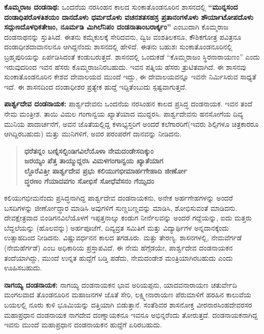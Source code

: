 \textbf{ಕೊಮ್ಮರಾಜ ದಂಡನಾಥ:} ಒಂದನೆಯ ನರಸಿಂಹನ ಕಾಲದ ಸುಂಕಾತೊಂಡನೂರಿನ ಶಾಸನದಲ್ಲಿ \textbf{“ಮುನ್ನಸಂದ\general{\break } ದಂಡಾಧಿಪರೊಳತಿಶಯಂ ದಾನದೊಳು ಧರ್ಮದೊಳು ವಚನಶತಸಹಸ್ರ ಪ್ರತಾನಂಗಳೊಳು ಶೌರ್ಯಾಟೋಪದೊಳು\general{\break } ಸದ್ಗುಣದೊಳಧಿಕತೇಜಂ, ನೂರ್ಮಡಿ ಮಿಗಿಲೆನಿಪಂ ದಂಡನಾತಾಂಬರಾರ್ಕ್ಕಂ” }ಎಂಬುದಾಗಿ ಕೊಮ್ಮರಾಜ ದಂಡನಾಥನನ್ನು ಸ್ತುತಿಸಿದೆ. ಈತನು ಕಮ್ಮೆಕುಲಕ್ಕೆ ಸೇರಿದವನು, ದ್ವಿಜ ವಂಶತಿಲಕನೂ, ಕೌಶಿಕಗೋತ್ರ ಪವಿತ್ರನೂ ದಂಡಾಧೀಶದಾವಾನಲನೂ ಆಗಿದ್ದನೆಂದು ಶಾಸನದಲ್ಲಿ ಹೇಳಿದೆ. ಈತನು ಬಹುಶಃ ಸುಂಕಾತೊಂಡನೂರಿನಲ್ಲಿ ಬ್ರಹ್ಮಪುರಿಯನ್ನು ಏರ್ಪಡಿಸಿದಂತೆ ಕಂಡುಬರುತ್ತದೆ. ಶಾಸನದಲ್ಲಿ ಒಂದುಕಡೆ “ಕೊಮ್ಮರಾಜಂ ಸ್ಥಿರನಾರಾಯಣಂ” ಎಂದು ಇರುವುದರಿಂದ ಇವನ ಹೆಸರು ಕೊಮ್ಮರಾಜನಿರಬಹುದು. ಇವನ ಪತ್ನಿಯ ಹೆಸರು ತ್ರುಟಿತವಾಗಿದೆ. ಈ ಶಾಸನವು ಸುಂಕಾತೊಂಡನೂರಿನ ಕೇಶವ ದೇವಾಲಯದ ಮುಂದೆ ಇದ್ದು, ಈ ದೇವಾಲಯವನ್ನೂ ಇವನೇ ನಿರ್ಮಿಸಿರುವ ಸಾಧ್ಯತೆ ಇದೆ. ಈ ಶಾಸನದಿಂದ ದಂಡಾಧೀಶರ ಪ್ರತ್ಯೇಕ ಹುದ್ದೆ ಇದ್ದಿತೆಂಬುದು ಸ್ಪಷ್ಟವಾಗುತ್ತದೆ.

\textbf{ಪಾರ್ಶ್ವದೇವ ದಂಡನಾಯಕ:} ಪಾರ್ಶ್ವದೇವನು ಒಂದನೆಯ ನರಸಿಂಹನ ಕಾಲದ ಪ್ರಸಿದ್ಧ ದಂಡನಾಯಕ. ಇವನ ತಂದೆ ನೇಮ ಮಂತ್ರೀಶ. ತಾಯಿ ವಿಮಲ ಗಂಗಾನ್ವಯ ಖ್ಯಾತೆಯಾದ ಮುದ್ದರಸಿ. ಪಾರ್ಶ್ವದೇವನು ಹನಸೋಗೆಯ ದಿವ್ಯ ಮುನಿಯ ಪಾದಾರ್ಚನೆಗೆ, ಅವನ ಜೊತೆಯಲ್ಲಿದ್ದ ಕಳಾಭ್ಯಸ್ತರಿಗೆ ಅಂದರೆ ಕಲೆಗಾರರಿಗೆ(ಇವರು ಶಿಲ್ಪಿಗಳೂ ಚಿತ್ರಕಾರರೂ ಆಗಿದ್ದಿರಬಹುದು) ಮತ್ತು ಮುನಿಗಳಿಗೆ, ಅವರ ಪರಂಪರೆಗೆ ದಾನವನ್ನು ನೀಡಿದನು.

\begin{verse}
\textbf{ಧರೆತನ್ನಂ ಬಣ್ನಿಸಲ್ಬಿಂಡಿಗವಿಲೆಯೊಳಾ ನೇಮದಂಡೇಸದಿಕ್ಕುಂ} \\\textbf{ಜರಯ್ಯಂ ಪೆತ್ತ ತಾಯ್ಮುದ್ದರಸಿ ವಿಮಳಗಂಗಾನ್ವಯ ಖ್ಯಾತೆಯಾಗ} \\\textbf{ಲ್ದೊರೆವಿತ್ತೀ ಪಾರ್ಶ್ವದೇವ ಪ್ರಭು ಕಲಿಯುಗಭೀಮಾರ್ಹಗೇಹಾದಿ ಜೀರ್ಣೋ} \\\textbf{ದ್ಧರಣಂ ಗೆಯಾದವಗಂ ಸೋಭಿಸೆ ಸೋಧೆವೆಸನಂ ಗೆಯ್ಸಿದಂ}
\end{verse}

ಕಲಿಯುಗಭೀಮನೆಂದು ಪ್ರಸಿದ್ಧನಾಗಿದ್ದ ಪಾರ್ಶ್ವದೇವ ದಂಡನಾಯಕನು, ಅನೇಕ ಅರ್ಹಗೇಹಗಳನ್ನು ಅಂದರೆ ಬಸದಿ\-ಗಳನ್ನು ಜೀರ್ಣೋದ್ಧಾರ ಮಾಡಿಸಿ ಅವುಗಳಿಗೆ ಸುಣ್ಣಬಣ್ಣವನ್ನು ಮಾಡಿಸಿ, ಶೋಭಿಸುವಂತೆ ಮಾಡಿದನು. ದೇವಕ್ಷೇತ್ರವಾದ ಬಿಂಡಿಗನವಿಲೆಯೊಳಗೆ ಇಪ್ಪತ್ತನಾಲ್ಕು ಕಂಡುಗ ನೀರ್ನೆಲವನ್ನು ಅಂದರೆ ಗದ್ದೆಯನ್ನು, ಐದು ಮತ್ತರು ಬೆದ್ದಲೆಯನ್ನು (ಹೊಲವನ್ನು) ಅರ್ಹಪೂಜೆಗೆ, ದಿವ್ಯವ್ರತ ಸಮಿತಿಗೆ ಮತ್ತು ವಿದ್ಯಾರ್ಥಿಗಳ ಅನ್ನದಾನಕ್ಕೆಂದು ಉತ್ಸಾಹದಿಂದ ನೀಡಿದನು. ವಿಷ್ಣುವರ್ಧನನ ಕಾಲದ ತಗಡೂರು. ಮತ್ತು ತೇರಣ್ಯ. ಶಾಸನಗಳಲ್ಲಿ, ನೇಮವೆರ್ಗಡೆ (ನೇಮಹೆರ್ಗಡೆ) ಎಂಬ ಅಧಿಕಾರಿಯ ಪ್ರಸ್ತಾಪವಿದೆ. ಈ ನೇಮ ಹೆಗ್ಗೆಡಯೇ, ಪಾರ್ಶ್ವದೇವ ದಂಡನಾಯಕನ ತಂದೆಯಾಗಿದ್ದು, ಮುಂದೆ ಉನ್ನತ ಹುದ್ದೆಗೆ ಬಡ್ತಿ ಪಡೆದು, ನೇಮದಂಡೇಶ ಮಂತ್ರಿಯಾಗಿರಬಹುದು ಎಂದು ಊಹಿಸಬಹುದು.

\textbf{ನಾಗಯ್ಯ ದಂಡನಾಯಕ:} ನಾಗಯ್ಯ ದಂಡನಾಯಕನ ಭಾವ ಅರಿಯಪ್ಪನು, ಯಾದವನಾರಾಯಣ ಚತುರ್ವೇದಿ ಮಂಗಲವಾದ ತೊಂಡನೂರಿನ ಮಹಾಜನಗಳ ಜೊತೆ ಸೇರಿ, ಲಕ್ಷ್ಮೀನಾರಾಯಣ ಪೆರುಮಾಳಿಗೆ ಹರಹಿನ ಕಾಲುವೆಯ ಬಯಲಲ್ಲಿ ನೂರು ಕುಳಿ ಭೂಮಿಯನ್ನು ದತ್ತಿಯಾಗಿ ಬಿಡುತ್ತಾನೆ. ಸಂತೆಶಿವರ ಶಾಸನೋಕ್ತ ವೀರನಾರಸಿಂಹದೇವರಸರ ಮಹಾಪ್ರಧಾನ ದಂಡನಾಯಕ ನಾಗದೇವ ದಂಣ್ನಾಯಕನೂ ಇವನೂ ಅಭಿನ್ನರೆಂದು ತೋರುತ್ತದೆ. ದಂಡನಾಯಕನಾಗಿದ್ದ ಇವನು ಮುಂದೆ ಮಹಾಪ್ರಧಾನ ದಂಡನಾಯಕನ ಹುದ್ದೆಗೆ ಏರಿರಬಹುದು.


